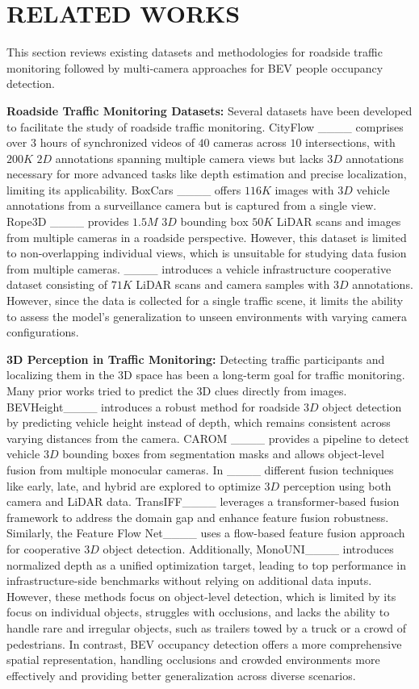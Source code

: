 \section{RELATED WORKS}
\label{sec:related_works}
This section reviews existing datasets and methodologies for roadside traffic monitoring followed by multi-camera approaches for BEV people occupancy detection.

\textbf{Roadside Traffic Monitoring Datasets:} Several datasets have been developed to facilitate the study of roadside traffic monitoring. CityFlow ____ comprises over $3$ hours of synchronized videos of $40$ cameras across $10$ intersections, with $200K$ $2D$ annotations spanning multiple camera views but lacks $3D$ annotations necessary for more advanced tasks like depth estimation and precise localization, limiting its applicability. BoxCars ____ offers $116K$ images with $3D$ vehicle annotations from a surveillance camera but is captured from a single view. Rope3D ____ provides $1.5M$ $3D$ bounding box $50K$ LiDAR scans and images from multiple cameras in a roadside perspective. However, this dataset is limited to non-overlapping individual views, which is unsuitable for studying data fusion from multiple cameras. ____ introduces a vehicle infrastructure cooperative dataset consisting of $71K$ LiDAR scans and camera samples with $3D$ annotations. However, since the data is collected for a single traffic scene, it limits the ability to assess the model's generalization to unseen environments with varying camera configurations.

\textbf{3D Perception in Traffic Monitoring:} Detecting traffic participants and localizing them in the 3D space has been a long-term goal for traffic monitoring. Many prior works tried to predict the 3D clues directly from images. BEVHeight____ introduces a robust method for roadside $3D$ object detection by predicting vehicle height instead of depth, which remains consistent across varying distances from the camera. CAROM ____ provides a pipeline to detect vehicle $3D$ bounding boxes from segmentation masks and allows object-level fusion from multiple monocular cameras. In ____ different fusion techniques like early, late, and hybrid are explored to optimize $3D$ perception using both camera and LiDAR data. TransIFF____ leverages a transformer-based fusion framework to address the domain gap and enhance feature fusion robustness. Similarly, the Feature Flow Net____ uses a flow-based feature fusion approach for cooperative $3D$ object detection. Additionally, MonoUNI____ introduces normalized depth as a unified optimization target, leading to top performance in infrastructure-side benchmarks without relying on additional data inputs. However, these methods focus on object-level detection, which is limited by its focus on individual objects, struggles with occlusions, and lacks the ability to handle rare and irregular objects, such as trailers towed by a truck or a crowd of pedestrians. In contrast, BEV occupancy detection offers a more comprehensive spatial representation, handling occlusions and crowded environments more effectively and providing better generalization across diverse scenarios.


